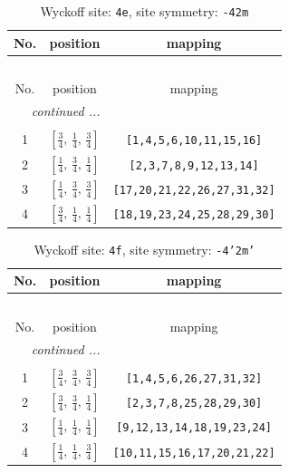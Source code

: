 \documentclass[fleqn,8pt]{jsarticle}
\begin{document}
\renewcommand{\arraystretch}{1.2}
\begin{longtable}{ccc}
\caption{Wyckoff site: {\tt 4e}, site symmetry: {\tt -42m}}
 \\
 \hline \hline
No. & position & mapping \\ \hline \endfirsthead

\multicolumn{2}{l}{\tablename\ \thetable{}} \\
 \hline \hline
No. & position & mapping \\ \hline \endhead

 \hline \hline
\multicolumn{2}{r}{\footnotesize\it continued ...} \\ \endfoot

 \hline \hline
\multicolumn{2}{r}{} \\ \endlastfoot

1 & $\left[ \frac{3}{4},\, \frac{1}{4},\, \frac{3}{4} \right]$ & {\tt [1,4,5,6,10,11,15,16]} \\ \hline
2 & $\left[ \frac{1}{4},\, \frac{3}{4},\, \frac{1}{4} \right]$ & {\tt [2,3,7,8,9,12,13,14]} \\ \hline
3 & $\left[ \frac{1}{4},\, \frac{3}{4},\, \frac{3}{4} \right]$ & {\tt [17,20,21,22,26,27,31,32]} \\ \hline
4 & $\left[ \frac{3}{4},\, \frac{1}{4},\, \frac{1}{4} \right]$ & {\tt [18,19,23,24,25,28,29,30]} \\
\end{longtable}
\renewcommand{\arraystretch}{1.2}
\begin{longtable}{ccc}
\caption{Wyckoff site: {\tt 4f}, site symmetry: {\tt -4'2m'}}
 \\
 \hline \hline
No. & position & mapping \\ \hline \endfirsthead

\multicolumn{2}{l}{\tablename\ \thetable{}} \\
 \hline \hline
No. & position & mapping \\ \hline \endhead

 \hline \hline
\multicolumn{2}{r}{\footnotesize\it continued ...} \\ \endfoot

 \hline \hline
\multicolumn{2}{r}{} \\ \endlastfoot

1 & $\left[ \frac{3}{4},\, \frac{3}{4},\, \frac{3}{4} \right]$ & {\tt [1,4,5,6,26,27,31,32]} \\ \hline
2 & $\left[ \frac{3}{4},\, \frac{3}{4},\, \frac{1}{4} \right]$ & {\tt [2,3,7,8,25,28,29,30]} \\ \hline
3 & $\left[ \frac{1}{4},\, \frac{1}{4},\, \frac{1}{4} \right]$ & {\tt [9,12,13,14,18,19,23,24]} \\ \hline
4 & $\left[ \frac{1}{4},\, \frac{1}{4},\, \frac{3}{4} \right]$ & {\tt [10,11,15,16,17,20,21,22]} \\
\end{longtable}
\end{document}
